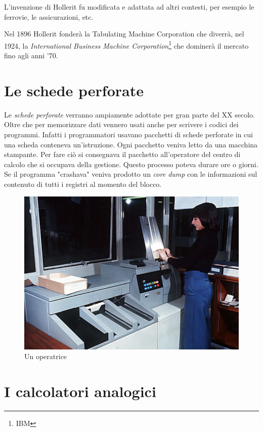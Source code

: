 L'invenzione di Hollerit fu modificata e adattata ad altri contesti, per esempio le ferrovie, le assicurazioni, etc.

Nel 1896 Hollerit fonderà la Tabulating Machine Corporation che diverrà, nel 1924, la \textit{International Business Machine Corporation}\footnote{IBM} che dominerà il mercato fino agli anni '70.

\section{Le schede perforate}

Le \textit{schede perforate} verranno ampiamente adottate per gran parte del XX secolo. Oltre che per memorizzare dati vennero usati anche per scrivere i codici dei programmi. Infatti i programmatori usavano pacchetti di schede perforate in cui una scheda conteneva un'istruzione. Ogni pacchetto veniva letto da una macchina stampante. Per fare ciò si consegnava il pacchetto all'operatore del centro di calcolo che si occupava della gestione. Questo processo poteva durare ore o giorni. Se il programma "crashava" veniva prodotto un \textit{core dump} con le informazioni sul contenuto di tutti i registri al momento del blocco.

\begin{figure}
    \centering
    \includegraphics[scale = 0.5]{images/storia arch/Operatrice.png}
    \caption{Un operatrice}
    \label{fig:scheda perforata}
\end{figure}

\section{I calcolatori analogici}

